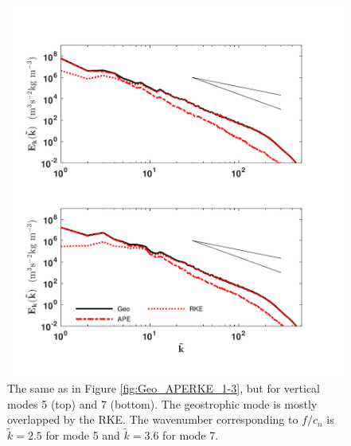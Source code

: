 \begin{figure}[H]
\includegraphics[scale=1]{Chapter4/img/Geo_APERKE_5-7}
\caption{The same as in Figure \ref{fig:Geo_APERKE_1-3}, but for vertical modes 5 (top) and 7 (bottom). The geostrophic mode is mostly overlapped by the RKE. The wavenumber corresponding to $f/c_n$ is $\tilde{k} = 2.5$ for mode 5 and $\tilde{k} = 3.6$ for mode 7.}
\label{fig:Geo_APERKE_5-7}
\end{figure}

